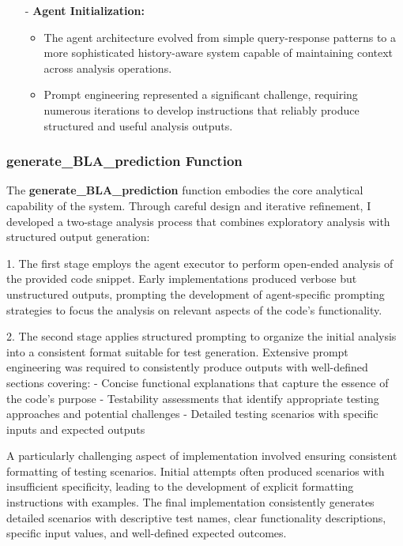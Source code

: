 \begin{itemize}
    \item[-] \textbf{Agent Initialization:}
    \begin{itemize}
        \item The agent architecture evolved from simple query-response patterns to a more sophisticated history-aware system capable of maintaining context across analysis operations.
        \item Prompt engineering represented a significant challenge, requiring numerous iterations to develop instructions that reliably produce structured and useful analysis outputs.
    \end{itemize}
\end{itemize}

\subsubsection{generate\_BLA\_prediction Function}

The \textbf{generate\_BLA\_prediction} function embodies the core analytical capability of the system. Through careful design and iterative refinement, I developed a two-stage analysis process that combines exploratory analysis with structured output generation:

1. The first stage employs the agent executor to perform open-ended analysis of the provided code snippet. Early implementations produced verbose but unstructured outputs, prompting the development of agent-specific prompting strategies to focus the analysis on relevant aspects of the code's functionality.

2. The second stage applies structured prompting to organize the initial analysis into a consistent format suitable for test generation. Extensive prompt engineering was required to consistently produce outputs with well-defined sections covering:
   - Concise functional explanations that capture the essence of the code's purpose
   - Testability assessments that identify appropriate testing approaches and potential challenges
   - Detailed testing scenarios with specific inputs and expected outputs

A particularly challenging aspect of implementation involved ensuring consistent formatting of testing scenarios. Initial attempts often produced scenarios with insufficient specificity, leading to the development of explicit formatting instructions with examples. The final implementation consistently generates detailed scenarios with descriptive test names, clear functionality descriptions, specific input values, and well-defined expected outcomes.

